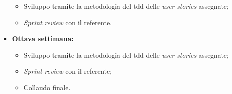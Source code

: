 \begin{itemize}
    \begin{itemize}
      \item Sviluppo tramite la metodologia del \acrshort{tdd} delle \emph{user stories} assegnate;
      \item \emph{Sprint review} con il referente.
    \end{itemize}
  \item \textbf{Ottava settimana:} 
    \begin{itemize}
      \item Sviluppo tramite la metodologia del \acrshort{tdd} delle \emph{user stories} assegnate;
      \item \emph{Sprint review} con il referente;
      \item Collaudo finale.
    \end{itemize}
\end{itemize}